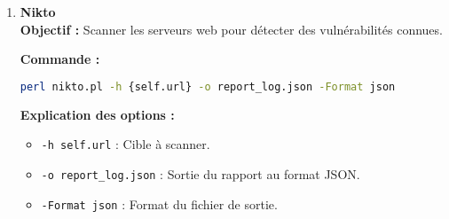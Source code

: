 \begin{justify}
\begin{enumerate}[left=0cm]
        \textbf{Commande :}
        \begin{lstlisting}[language=bash]
        python {sqlmap_path} -u {self.url} --batch --level={self.setting['sqlmap_level']} --risk={self.setting['sqlmap_risk']} --crawl={self.setting['sqlmap_crawl']} --answers=follow=Y,crawl=Y,sitemap=Y --threads={self.setting['sqlmap_threads']} --technique={self.setting['sqlmap_technique']} --flush-session --output-dir={report_res_path}
        \end{lstlisting}
        
        \textbf{Explication des options :}
        \begin{itemize}[label=$\bullet$]
            \item \texttt{-u {url}} : URL cible.
            \item \texttt{--batch} : Mode non interactif.
            \item \texttt{--level} : Niveau d’agressivité.
            \item \texttt{--risk} : Niveau de risque.
            \item \texttt{--crawl} : Exploration automatique des liens.
            \item \texttt{--answers} : Réponses automatiques aux prompts.
            \item \texttt{--threads} : Nombre de threads.
            \item \texttt{--technique} : Techniques d’injection à utiliser.
        \end{itemize}
        
        \textbf{Résultat attendu :}
        Rapport complet contenant les types de vulnérabilités SQL détectées et leurs exploitations potentielles.
    \item \textbf{Nikto} \\
        \textbf{Objectif :} Scanner les serveurs web pour détecter des vulnérabilités connues.
        
        \textbf{Commande :}
        \begin{lstlisting}[language=bash]
        perl nikto.pl -h {self.url} -o report_log.json -Format json
        \end{lstlisting}
        
        \textbf{Explication des options :}
        \begin{itemize}[label=$\bullet$]
            \item \texttt{-h {self.url}} : Cible à scanner.
            \item \texttt{-o report\_log.json} : Sortie du rapport au format JSON.
            \item \texttt{-Format json} : Format du fichier de sortie.
        \end{itemize}
        

\end{enumerate}
\end{justify}
